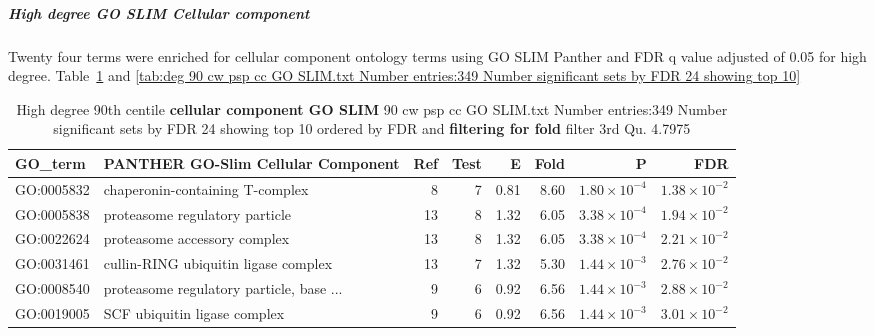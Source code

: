 \subparagraph{High degree GO SLIM Cellular component}
Twenty four terms were enriched for cellular component ontology terms using GO SLIM Panther and FDR q value adjusted of 0.05 for high degree. 
Table~\ref{tab:deg 90 cw psp cc GO SLIM.txt Number entries:349 Number significant sets by FDR 24 showing top 10 ordered by FDR and filtering for fold filter 3rd Qu. 4.7975} and \ref{tab:deg 90 cw psp cc GO SLIM.txt Number entries:349 Number significant sets by FDR 24 showing top 10}

\begin{table}[ht]
\centering
\begin{adjustbox}{width=\textwidth}
\begin{tabular}{llrrrrrr}
  \hline
GO\_term & \textbf{PANTHER GO-Slim Cellular Component} & Ref & Test & E & Fold & P & FDR \\ 
  \hline
GO:0005832 & chaperonin-containing T-complex  & 8 & 7 & 0.81 & 8.60 & $1.80 \times 10^{-4}$ & $1.38 \times 10^{-2}$ \\ 
  GO:0005838 & proteasome regulatory particle  & 13 & 8 & 1.32 & 6.05 & $3.38 \times 10^{-4}$ & $1.94 \times 10^{-2}$ \\ 
  GO:0022624 & proteasome accessory complex  & 13 & 8 & 1.32 & 6.05 & $3.38 \times 10^{-4}$ & $2.21 \times 10^{-2}$ \\ 
  GO:0031461 & cullin-RING ubiquitin ligase complex  & 13 & 7 & 1.32 & 5.30 & $1.44 \times 10^{-3}$ & $2.76 \times 10^{-2}$ \\ 
  GO:0008540 & proteasome regulatory particle, base ... & 9 & 6 & 0.92 & 6.56 & $1.44 \times 10^{-3}$ & $2.88 \times 10^{-2}$ \\ 
  GO:0019005 & SCF ubiquitin ligase complex  & 9 & 6 & 0.92 & 6.56 & $1.44 \times 10^{-3}$ & $3.01 \times 10^{-2}$ \\ 
  \hline
\end{tabular}
\end{adjustbox}
\caption{High degree 90th centile \textbf{cellular component GO SLIM} 90 cw psp cc GO SLIM.txt Number entries:349 Number significant sets by FDR 24 showing top 10 ordered by FDR and \textbf{filtering for fold} filter 3rd Qu. 4.7975} 
\label{tab:deg 90 cw psp cc GO SLIM.txt Number entries:349 Number significant sets by FDR 24 showing top 10 ordered by FDR and filtering for fold filter 3rd Qu. 4.7975}
\end{table}
